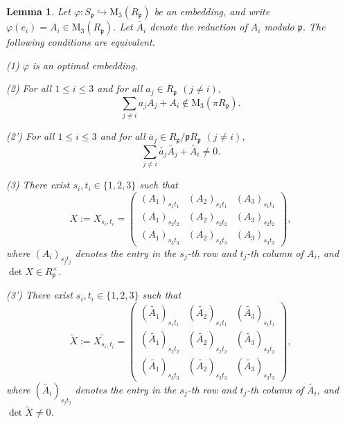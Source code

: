 \documentclass[12pt]{article}
\theoremstyle{plain}
\newtheorem{lemma}[theorem]{Lemma}
\theoremstyle{definition}
\theoremstyle{remark}
\begin{document}
\begin{lemma}\label{optimal}
Let $\varphi : S_\mathfrak{p} \hookrightarrow \mathrm{M}_3(R_\mathfrak{p})$ be an embedding, and write $\varphi(e_i)=A_i \in \mathrm{M}_3(R_\mathfrak{p})$. Let $\widetilde{A_i}$ denote the reduction of $A_i$ modulo $\mathfrak{p}$. The following conditions are equivalent.

(1) $\varphi$ is an optimal embedding.

(2) For all $1 \le i \le 3$ and for all $a_j \in R_\mathfrak{p}$ $(j \ne i)$,
$$\sum_{j \ne i} a_j A_j + A_i \notin \mathrm{M}_3(\pi R_\mathfrak{p}).$$

(2') For all $1 \le i \le 3$ and for all $\overline{a}_j \in R_\mathfrak{p}/\mathfrak{p}R_\mathfrak{p}$ $(j \ne i)$,
$$\sum_{j \ne i} \widetilde{a_j} \widetilde{A_j} + \widetilde{A_i} \ne 0.$$

(3) There exist $s_i, t_i \in \{1,2,3\}$ such that $$X := X_{s_i,t_i} =
\begin{pmatrix}
(A_1)_{s_1 t_1} & (A_2)_{s_1 t_1} & (A_3)_{s_1 t_1} \\
(A_1)_{s_2 t_2} & (A_2)_{s_2 t_2} & (A_3)_{s_2 t_2} \\
(A_1)_{s_3 t_3} & (A_2)_{s_3 t_3} & (A_3)_{s_3 t_3}
\end{pmatrix},$$
where $(A_i)_{s_j t_j}$ denotes the entry in the $s_j$-th row and $t_j$-th column of $A_i$, and $\det X \in R_\mathfrak{p}^\times$.

(3') There exist $s_i, t_i \in \{1,2,3\}$ such that $$\widetilde{X} := \widetilde{X_{s_i,t_i}} =
\begin{pmatrix}
(\widetilde{A_1})_{s_1 t_1} & (\widetilde{A_2})_{s_1 t_1} & (\widetilde{A_3})_{s_1 t_1} \\
(\widetilde{A_1})_{s_2 t_2} & (\widetilde{A_2})_{s_2 t_2} & (\widetilde{A_3})_{s_2 t_2} \\
(\widetilde{A_1})_{s_3 t_3} & (\widetilde{A_2})_{s_3 t_3} & (\widetilde{A_3})_{s_3 t_3}
\end{pmatrix},$$
where $(\widetilde{A_i})_{s_j t_j}$ denotes the entry in the $s_j$-th row and $t_j$-th column of $\widetilde{A_i}$, and $\det \widetilde{X} \ne 0$.
\end{lemma}
\end{document}
